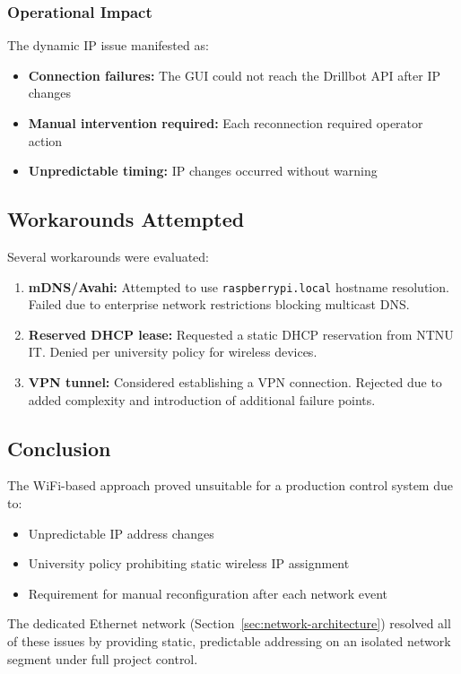\subsubsection{Operational Impact}

The dynamic IP issue manifested as:
\begin{itemize}
    \item \textbf{Connection failures:} The GUI could not reach the Drillbot API after IP changes
    \item \textbf{Manual intervention required:} Each reconnection required operator action
    \item \textbf{Unpredictable timing:} IP changes occurred without warning
\end{itemize}

\subsection{Workarounds Attempted}

Several workarounds were evaluated:

\begin{enumerate}
    \item \textbf{mDNS/Avahi:} Attempted to use \texttt{raspberrypi.local} hostname resolution. Failed due to enterprise network restrictions blocking multicast DNS.

    \item \textbf{Reserved DHCP lease:} Requested a static DHCP reservation from NTNU IT. Denied per university policy for wireless devices.

    \item \textbf{VPN tunnel:} Considered establishing a VPN connection. Rejected due to added complexity and introduction of additional failure points.
\end{enumerate}

\subsection{Conclusion}

The WiFi-based approach proved unsuitable for a production control system due to:
\begin{itemize}
    \item Unpredictable IP address changes
    \item University policy prohibiting static wireless IP assignment
    \item Requirement for manual reconfiguration after each network event
\end{itemize}

The dedicated Ethernet network (Section~\ref{sec:network-architecture}) resolved all of these issues by providing static, predictable addressing on an isolated network segment under full project control.
